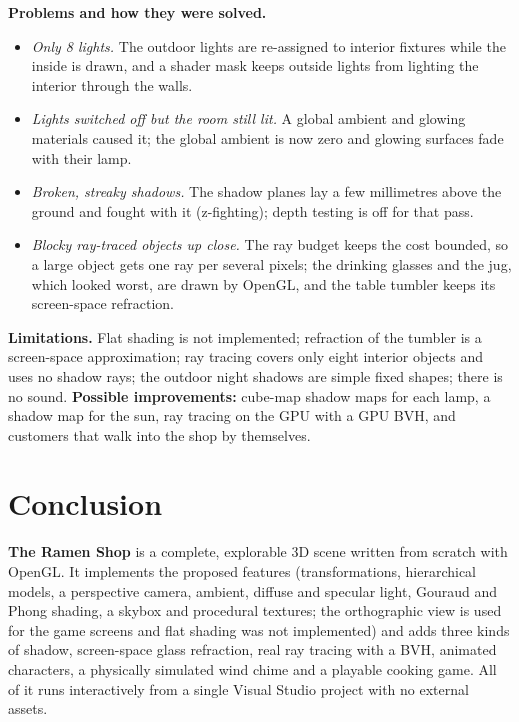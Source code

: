 \documentclass[10pt,a4paper]{article}
\begin{document}
\textbf{Problems and how they were solved.}
\begin{itemize}
\item \emph{Only 8 lights.} The outdoor lights are re-assigned to interior fixtures while the inside is drawn, and a shader mask keeps outside lights from lighting the interior through the walls.
\item \emph{Lights switched off but the room still lit.} A global ambient and glowing materials caused it; the global ambient is now zero and glowing surfaces fade with their lamp.
\item \emph{Broken, streaky shadows.} The shadow planes lay a few millimetres above the ground and fought with it (z-fighting); depth testing is off for that pass.
\item \emph{Blocky ray-traced objects up close.} The ray budget keeps the cost bounded, so a large object gets one ray per several pixels; the drinking glasses and the jug, which looked worst, are drawn by OpenGL, and the table tumbler keeps its screen-space refraction.
\end{itemize}
\textbf{Limitations.} Flat shading is not implemented; refraction of the tumbler is a screen-space approximation; ray tracing covers only eight interior objects and uses no shadow rays; the outdoor night shadows are simple fixed shapes; there is no sound. \textbf{Possible improvements:} cube-map shadow maps for each lamp, a shadow map for the sun, ray tracing on the GPU with a GPU BVH, and customers that walk into the shop by themselves.

\section{Conclusion}
\textbf{The Ramen Shop} is a complete, explorable 3D scene written from scratch with OpenGL. It implements the proposed features (transformations, hierarchical models, a perspective camera, ambient, diffuse and specular light, Gouraud and Phong shading, a skybox and procedural textures; the orthographic view is used for the game screens and flat shading was not implemented) and adds three kinds of shadow, screen-space glass refraction, real ray tracing with a BVH, animated characters, a physically simulated wind chime and a playable cooking game. All of it runs interactively from a single Visual Studio project with no external assets.
\end{document}
